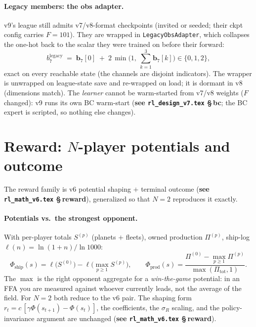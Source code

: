 \documentclass[11pt]{article}
\newcommand{\cd}[1]{\texttt{#1}}
\newcommand{\vsixref}[1]{\textbf{see \texttt{rl\_math\_v6.tex} \S\,#1}}
\newcommand{\vsevenref}[1]{\textbf{see \texttt{rl\_design\_v7.tex} \S\,#1}}
\begin{document}
\paragraph{Legacy members: the obs adapter.} v9's league still admits v7/v8-format checkpoints
(invited or seeded; their ckpt config carries $F{=}101$). They are wrapped in
\cd{LegacyObsAdapter}, which collapses the one-hot back to the scalar they were trained on before
their forward:
\begin{equation}
b_7^{\text{legacy}} \;=\; \mathbf b_7[0] \;+\; 2\,\min\!\Big(1,\ \textstyle\sum_{k=1}^{3}\mathbf b_7[k]\Big)
\in\{0,1,2\},
\end{equation}
exact on every reachable state (the channels are disjoint indicators). The wrapper is unwrapped on
league-state save and re-wrapped on load; it is dormant in v8 (dimensions match). The \emph{learner}
cannot be warm-started from v7/v8 weights ($F$ changed): v9 runs its own BC warm-start
(\vsevenref{bc}; the BC expert is scripted, so nothing else changes).

\section{Reward: $N$-player potentials and outcome}\label{v9:reward}
The reward family is v6 potential shaping $+$ terminal outcome (\vsixref{reward}), generalized so
that $N{=}2$ reproduces it exactly.

\paragraph{Potentials vs.\ the strongest opponent.} With per-player totals $S^{(p)}$ (planets $+$
fleets), owned production $\Pi^{(p)}$, ship-log $\ell(n)=\ln(1{+}n)/\ln 1000$:
\begin{equation}
\Phi_{\mathrm{ship}}(s)=\ell\big(S^{(0)}\big)-\ell\big(\max_{p\ge1}S^{(p)}\big),\qquad
\Phi_{\mathrm{prod}}(s)=\frac{\Pi^{(0)}-\max_{p\ge1}\Pi^{(p)}}{\max(\Pi_{\mathrm{tot}},1)} .
\end{equation}
The $\max$ is the right opponent aggregate for a \emph{win-the-game} potential: in an FFA you are
measured against whoever currently leads, not the average of the field. For $N{=}2$ both reduce to
the v6 pair. The shaping form $r_t=c\,[\gamma\Phi(s_{t+1})-\Phi(s_t)]$, the coefficients, the
$\sigma_R$ scaling, and the policy-invariance argument are unchanged (\vsixref{reward}).
\end{document}
